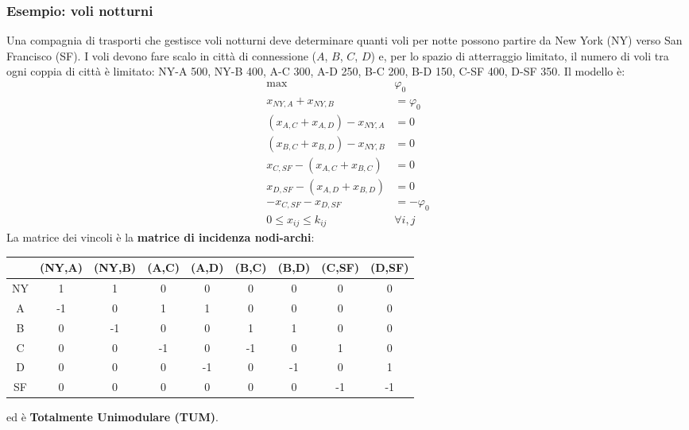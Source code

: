 \subsubsection*{Esempio: voli notturni}
Una compagnia di trasporti che gestisce voli notturni deve determinare quanti voli per notte possono partire da New York (NY) verso San Francisco (SF). I voli devono fare scalo in città di connessione ($A$, $B$, $C$, $D$) e, per lo spazio di atterraggio limitato, il numero di voli tra ogni coppia di città è limitato: NY-A 500, NY-B 400, A-C 300, A-D 250, B-C 200, B-D 150, C-SF 400, D-SF 350. Il modello è:
\begin{equation*}
	\begin{aligned}
		\max \quad & \varphi_0\\
		x_{NY,A}+x_{NY,B} & =\varphi_0\\
		(x_{A,C}+x_{A,D})-x_{NY,A} & =0\\
		(x_{B,C}+x_{B,D})-x_{NY,B} & =0\\
		x_{C,SF}-(x_{A,C}+x_{B,C}) & =0\\
		x_{D,SF}-(x_{A,D}+x_{B,D}) & =0\\
		-x_{C,SF}-x_{D,SF} & =-\varphi_0\\
		0\le x_{ij}\le k_{ij} \quad & \forall i,j
	\end{aligned}
\end{equation*}
La matrice dei vincoli è la \textbf{matrice di incidenza nodi-archi}:
\begin{center}
	\footnotesize
	\begin{tabular}{c|cccccccc}
		& (NY,A) & (NY,B) & (A,C) & (A,D) & (B,C) & (B,D) & (C,SF) & (D,SF)\\
		\hline
		NY & 1 & 1 & 0 & 0 & 0 & 0 & 0 & 0\\
		A & -1 & 0 & 1 & 1 & 0 & 0 & 0 & 0\\
		B & 0 & -1 & 0 & 0 & 1 & 1 & 0 & 0\\
		C & 0 & 0 & -1 & 0 & -1 & 0 & 1 & 0\\
		D & 0 & 0 & 0 & -1 & 0 & -1 & 0 & 1\\
		SF & 0 & 0 & 0 & 0 & 0 & 0 & -1 & -1
	\end{tabular}
\end{center}
ed è \textbf{Totalmente Unimodulare (TUM)}.

